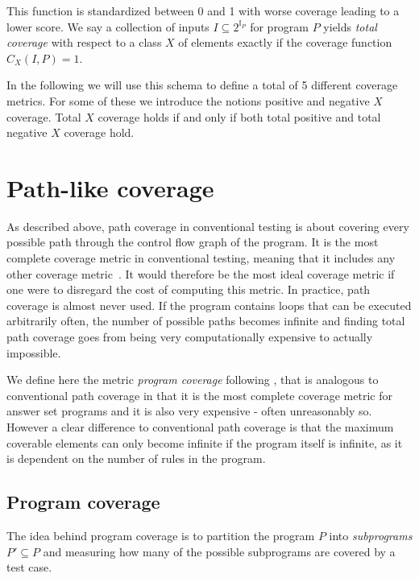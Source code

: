 This function is standardized between 0 and 1 with worse coverage leading to a lower score. We say a collection of inputs \(I \subseteq 2^{\mathbb{I}_P}\) for program $P$ yields \emph{total coverage} with respect to a class $X$ of elements exactly if the coverage function $C_X(I, P) = 1$.

In the following we will use this schema to define a total of 5 different coverage metrics. For some of these we introduce the notions positive and negative $X$ coverage. Total $X$ coverage holds if and only if both total positive and total negative $X$ coverage hold.

\section{Path-like coverage}
\label{sec:Coverage metrics/Path-like coverage}
As described above, path coverage in conventional testing is about covering every possible path through the control flow graph of the program. It is the most complete coverage metric in conventional testing, meaning that it includes any other coverage metric~\cite{Nta88}. It would therefore be the most ideal coverage metric if one were to disregard the cost of computing this metric. In practice, path coverage is almost never used. If the program contains loops that can be executed arbitrarily often, the number of possible paths becomes infinite and finding total path coverage goes from being very computationally expensive to actually impossible. 

We define here the metric \emph{program coverage} following \textcite{Jan+10}, that is analogous to conventional path coverage in that it is the most complete coverage metric for answer set programs and it is also very expensive - often unreasonably so. However a clear difference to conventional path coverage is that the maximum coverable elements can only become infinite if the program itself is infinite, as it is dependent on the number of rules in the program.


\subsection{Program coverage}
\label{subsec:Coverage metrics/Path-like coverage/Program coverage}
The idea behind program coverage is to partition the program $P$ into \emph{subprograms} \(P' \subseteq P\) and measuring how many of the possible subprograms are covered by a test case.


